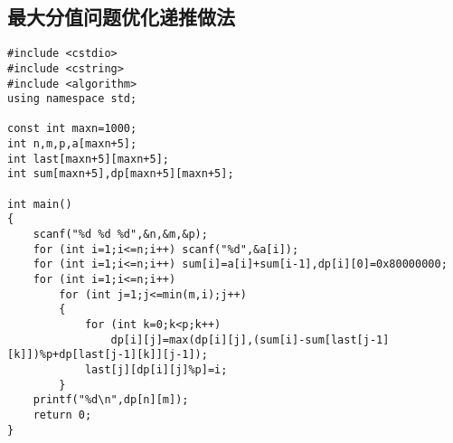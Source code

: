 \documentclass{article}
\begin{document}
\subsection{最大分值问题优化递推做法}

\begin{lstlisting}
#include <cstdio>
#include <cstring>
#include <algorithm>
using namespace std;

const int maxn=1000;
int n,m,p,a[maxn+5];
int last[maxn+5][maxn+5];
int sum[maxn+5],dp[maxn+5][maxn+5];

int main()
{
    scanf("%d %d %d",&n,&m,&p);
    for (int i=1;i<=n;i++) scanf("%d",&a[i]);
    for (int i=1;i<=n;i++) sum[i]=a[i]+sum[i-1],dp[i][0]=0x80000000;
    for (int i=1;i<=n;i++)
        for (int j=1;j<=min(m,i);j++)
        {
            for (int k=0;k<p;k++)
                dp[i][j]=max(dp[i][j],(sum[i]-sum[last[j-1][k]])%p+dp[last[j-1][k]][j-1]);
            last[j][dp[i][j]%p]=i;
        }
    printf("%d\n",dp[n][m]);
    return 0;
}
\end{lstlisting}
\end{document}
